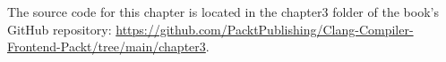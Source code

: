 The source code for this chapter is located in the chapter3 folder of the book’s GitHub repository: \url{https://github.com/PacktPublishing/Clang-Compiler-Frontend-Packt/tree/main/chapter3}.